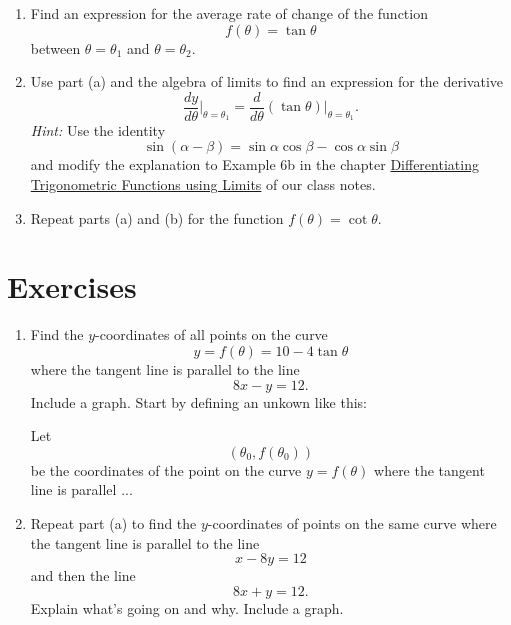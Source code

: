 \documentclass{ximera}
\begin{document}
\begin{question} \label{Pfmf3901}
\begin{enumerate}
\item Find an expression for the average rate of change of the function
\[
      f(\theta) = \tan\theta
\]
between $\theta  =\theta_1$ and $\theta = \theta_2$.

\item Use part (a) and the algebra of limits to find an expression for the derivative
\[
     \frac{dy}{d\theta}\Big|_{\theta = \theta_1} =  \frac{d}{d\theta}\left( \tan\theta  \right)\Big|_{\theta = \theta_1} .
\]
\emph{Hint:} Use the identity
\[
      \sin(\alpha - \beta) = \sin \alpha\cos\beta - \cos\alpha \sin \beta 
\]
and modify the explanation to Example 6b in the chapter 
\href{https://ximera.osu.edu/calcone/Calculus1/TrigIntro/TrigIntro}{Differentiating Trigonometric Functions using Limits}
of our class notes.

\item Repeat parts (a) and (b) for the function $f(\theta) = \cot\theta$.

\end{enumerate}
\end{question}

\section{Exercises}

\begin{exercise} \label{Qpfef34}
\begin{enumerate}
\item Find the $y$-coordinates of all points on the curve
\[
  y = f(\theta) = 10 - 4 \tan \theta
\]
where the tangent line is parallel to the line
\[
      8x - y = 12.
\]
Include a graph.
Start by defining an unkown like this:

Let 
\[
  (\theta_0 , f(\theta_0))
\]
be the coordinates of the point on the curve $y=f(\theta)$ where the tangent line is parallel ...

\item Repeat part (a) to find the $y$-coordinates of points on the same curve where the tangent line is parallel to the line
\[
   x - 8y = 12
\]
and then the line
\[
   8x + y = 12.
\]
Explain what's going on and why. Include a graph.
\end{enumerate}
\end{exercise}
\end{document}
